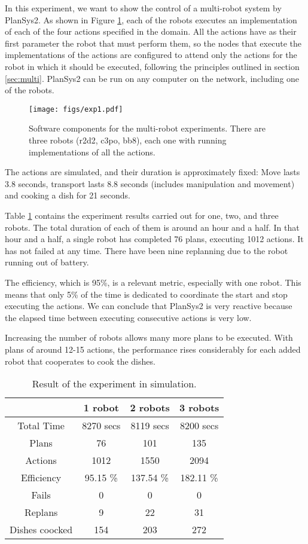 \documentclass[letterpaper, 10 pt, conference]{IEEEtran}
\begin{document}
In this experiment, we want to show the control of a multi-robot system by PlanSys2. As shown in Figure \ref{fig:exp1-sw}, each of the robots executes an implementation of each of the four actions specified in the domain. All the actions have as their first parameter the robot that must perform them, so the nodes that execute the implementations of the actions are configured to attend only the actions for the robot in which it should be executed, following the principles outlined in section \ref{sec:multi}. PlanSys2 can be run on any computer on the network, including one of the robots.

\begin{figure}[tb]
  \centering
  \texttt{[image: figs/exp1.pdf]}
  \caption{Software components for the multi-robot experiments. There are three robots (r2d2, c3po, bb8), each one with running implementations of all the actions.}
  \label{fig:exp1-sw}
\end{figure}

The actions are simulated, and their duration is approximately fixed: Move lasts 3.8 seconds, transport lasts 8.8 seconds (includes manipulation and movement) and cooking a dish for 21 seconds.

Table \ref{tab:exp1} contains the experiment results carried out for one, two, and three robots. The total duration of each of them is around an hour and a half. In that hour and a half, a single robot has completed 76 plans, executing 1012 actions. It has not failed at any time. There have been nine replanning due to the robot running out of battery. 

The efficiency, which is 95\%, is a relevant metric, especially with one robot. This means that only 5\% of the time is dedicated to coordinate the start and stop executing the actions. We can conclude that PlanSys2 is very reactive because the elapsed time between executing consecutive actions is very low.

Increasing the number of robots allows many more plans to be executed. With plans of around 12-15 actions, the performance rises considerably for each added robot that cooperates to cook the dishes.

\begin{table}[ht]
\caption{\label{tab:exp1}Result of the experiment in simulation.}
\centering
\begin{tabular}{|c|c|c|c|}
\hline      & \textbf{1 robot} & \textbf{2 robots} & \textbf{3 robots} \\\hline 
Total Time & 8270 secs     &    8119 secs    &  8200 secs    \\\hline 
Plans & 76     &    101    &  135     \\\hline 
Actions & 1012    &    1550    &  2094     \\\hline 
Efficiency & 95.15 \%     &    137.54 \%    &  182.11 \%     \\\hline 
Fails & 0     &    0    &  0     \\\hline 
Replans & 9  &    22    &  31    \\\hline 
Dishes coocked & 154&    203    &  272     \\\hline 
\end{tabular}
\end{table}
\end{document}
